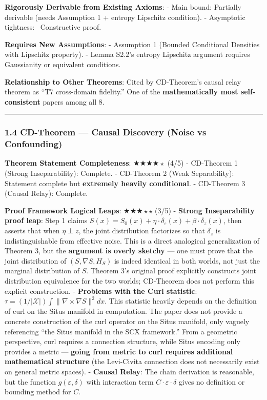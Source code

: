 \documentclass[
  12pt,
]{article}
\begin{document}
\textbf{Rigorously Derivable from Existing Axioms}:
- Main bound: Partially derivable (needs Assumption 1 + entropy Lipschitz condition).
- Asymptotic tightness: \checkmark\ Constructive proof.

\textbf{Requires New Assumptions}:
- Assumption 1 (Bounded Conditional Densities with Lipschitz property).
- Lemma S2.2's entropy Lipschitz argument requires Gaussianity or equivalent conditions.

\textbf{Relationship to Other Theorems}: Cited by CD-Theorem's causal relay theorem as ``T7 cross-domain fidelity.'' One of the \textbf{mathematically most self-consistent} papers among all 8.

\begin{center}\rule{0.5\linewidth}{0.5pt}\end{center}

\subsubsection{1.4 CD-Theorem --- Causal Discovery (Noise vs Confounding)}\label{cd-theorem-causal-discovery-noise-vs-confounding}

\textbf{Theorem Statement Completeness}: $\bigstar\bigstar\bigstar\bigstar{\scriptstyle\star}$ (4/5)
- CD-Theorem 1 (Strong Inseparability): Complete.
- CD-Theorem 2 (Weak Separability): Statement complete but \textbf{extremely heavily conditional}.
- CD-Theorem 3 (Causal Relay): Complete.

\textbf{Proof Framework Logical Leaps}: $\bigstar\bigstar\bigstar{\scriptstyle\star}{\scriptstyle\star}$ (3/5)
- \textbf{Strong Inseparability proof leap}: Step 1 claims $S(x) = S_0(x) + \eta\cdot\delta_\varepsilon(x) + \beta\cdot\delta_z(x)$, then asserts that when $\eta\perp z$, the joint distribution factorizes so that $\delta_z$ is indistinguishable from effective noise. This is a direct analogical generalization of Theorem 3, but the \textbf{argument is overly sketchy} --- one must prove that the joint distribution of $(S, \nabla S, H_S)$ is indeed identical in both worlds, not just the marginal distribution of $S$. Theorem 3's original proof explicitly constructs joint distribution equivalence for the two worlds; CD-Theorem does not perform this explicit construction.
- \textbf{Problems with the Curl statistic}: $\tau = (1/|\mathcal{X}|)\int\|\nabla\times\hat{\nabla}S\|^2 dx$. This statistic heavily depends on the definition of curl on the Situs manifold in computation. The paper does not provide a concrete construction of the curl operator on the Situs manifold, only vaguely referencing ``the Situs manifold in the SCX framework.'' From a geometric perspective, curl requires a connection structure, while Situs encoding only provides a metric --- \textbf{going from metric to curl requires additional mathematical structure} (the Levi-Civita connection does not necessarily exist on general metric spaces).
- \textbf{Causal Relay}: The chain derivation is reasonable, but the function $g(\varepsilon,\delta)$ with interaction term $C\cdot\varepsilon\cdot\delta$ gives no definition or bounding method for $C$.
\end{document}
